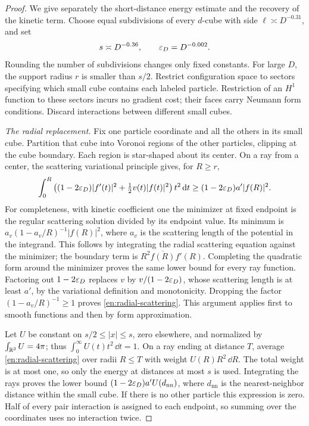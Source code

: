 \begin{proof}
We give separately the short-distance energy estimate and the recovery of
the kinetic term.  Choose equal subdivisions of every \(d\)-cube with
side \(\ell\asymp D^{-0.31}\), and set
\[
 s\asymp D^{-0.36},\qquad \varepsilon_D=D^{-0.002}.
\]
Rounding the number of subdivisions changes only fixed constants.  For
large \(D\), the support radius \(r\) is smaller than \(s/2\).
Restrict configuration space to sectors specifying which small cube
contains each labeled particle.  Restriction of an \(H^1\) function to
these sectors incurs no gradient cost; their faces carry Neumann form
conditions.  Discard interactions between different small cubes.

\emph{The radial replacement.}
Fix one particle coordinate and all the others in its small cube.  Partition
that cube into Voronoi regions of the other particles, clipping at the
cube boundary.  Each region is star-shaped about its center.  On a ray
from a center, the scattering variational principle gives, for \(R\ge r\),
\begin{equation}\label{en:radial-scattering}
 \int_0^R\left((1-2\varepsilon_D)|f'(t)|^2
           +\tfrac12v(t)|f(t)|^2\right)t^2\,\mathrm d t
       \ge (1-2\varepsilon_D)a'|f(R)|^2.
\end{equation}
For completeness, with kinetic coefficient one the minimizer at fixed
endpoint is the regular scattering solution divided by its endpoint
value.  Its minimum is
\(a_v(1-a_v/R)^{-1}|f(R)|^2\), where \(a_v\) is the scattering
length of the potential in the integrand.  This follows by integrating
the radial scattering equation against the minimizer; the boundary term
is \(R^2\overline{f(R)}f'(R)\).  Completing the quadratic form around
the minimizer proves the same lower bound for every ray function.
Factoring out \(1-2\varepsilon_D\) replaces \(v\) by
\(v/(1-2\varepsilon_D)\), whose scattering length is at least \(a'\),
by the variational definition and monotonicity.  Dropping the factor
\((1-a_v/R)^{-1}\ge1\) proves
\eqref{en:radial-scattering}.  This argument applies first to smooth
functions and then by form approximation.

Let \(U\) be constant on \(s/2\le |x|\le s\), zero elsewhere,
and normalized by \(\int_{\mathbb R^3}U=4\pi\); thus
\(\int_0^\infty U(t)t^2\,\dd t=1\).
On a ray ending at distance \(T\), average
\eqref{en:radial-scattering} over radii \(R\le T\) with weight
\(U(R)R^2\,\dd R\).  The total weight is at most one, so only
the energy at distances at most \(s\) is used.  Integrating the rays
proves the lower bound
\((1-2\varepsilon_D)a'U(d_{\mathrm{nn}})\), where
\(d_{\mathrm{nn}}\) is the nearest-neighbor distance within the
small cube.  If there is no other particle this expression is zero.
Half of every pair interaction is assigned to each endpoint, so summing
over the coordinates uses no interaction twice.


\end{proof}
